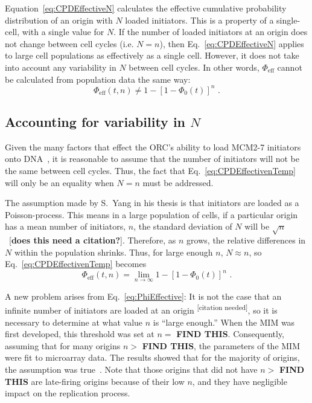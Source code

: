 		Equation~\ref{eq:CPDEffectiveN} calculates the effective cumulative probability distribution of an origin with $N$ loaded initiators.
		This is a property of a single-cell, with a single value for $N$.
		If the number of loaded initiators at an origin does not change between cell cycles (i.e. $N=n$), then Eq.~\ref{eq:CPDEffectiveN} applies to large cell populations as effectively as a single cell.
		However, it does not take into account any variability in $N$ between cell cycles.
		In other words, $\Phi_{\text{eff}}$ cannot be calculated from population data the same way:
		\begin{equation} \label{eq:CPDEffectivenTemp}
			\Phi_{\text{eff}}(t,n) \neq 1 - \left[1 - \Phi_0(t)\right]^n\text{ .}
		\end{equation}
		
		
		\subsection{Accounting for variability in $N$}
		\label{subsec:VariableN}
		
		Given the many factors that effect the ORC's ability to load MCM2-7 initiators onto DNA~\cite{MultiMCM}, it is reasonable to assume that the number of initiators will not be the same between cell cycles.
		Thus, the fact that Eq.~\ref{eq:CPDEffectivenTemp} will only be an equality when $N=n$ must be addressed.
		
		The assumption made by S.~Yang in his thesis is that initiators are loaded as a Poisson-process.
		This means in a large population of cells, if a particular origin has a mean number of initiators, $n$, the standard deviation of $N$ will be $\sqrt{n}$~[\textbf{does this need a citation?}].
		Therefore, as $n$ grows, the relative differences in $N$ within the population shrinks.
		Thus, for large enough $n$, $N\approx n$, so Eq.~\ref{eq:CPDEffectivenTemp} becomes
		\begin{equation} \label{eq:PhiEffective}
			\Phi_{\text{eff}}(t,n) = \lim_{n\to\infty} 1 - \left[1 - \Phi_0(t)\right]^n\text{ .}
		\end{equation}
		
		A new problem arises from Eq.~\ref{eq:PhiEffective}:
		It is not the case that an infinite number of initiators are loaded at an origin \textsuperscript{[citation needed]}, so it is necessary to determine at what value $n$ is ``large enough.''
		When the MIM was first developed, this threshold was set at $n=$ \textbf{FIND THIS}.
		Consequently, assuming that for many origins $n>$ \textbf{FIND THIS}, the parameters of the MIM were fit to microarray data.
		The results showed that for the majority of origins, the assumption was true~\cite{ScottsThesis}.
		Note that those origins that did not have $n>$ \textbf{FIND THIS} are late-firing origins because of their low $n$, and they have negligible impact on the replication process.
		
